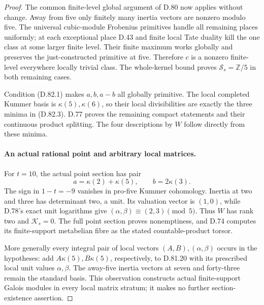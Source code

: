 \begin{proof}
The common finite-level global argument of D.80 now
applies without change. Away from five only finitely
many inertia vectors are nonzero modulo five.
The universal cubic-module Frobenius primitives handle
all remaining places uniformly; at each exceptional
place D.43 and finite local Tate duality kill the one
class at some larger finite level. Their finite maximum
works globally and preserves the just-constructed
primitive at five. Therefore \(c\) is a nonzero
finite-level everywhere locally trivial class. The
whole-kernel bound proves
\(\mathcal S_s=\mathbb Z/5\) in both remaining cases.

Condition (D.82.1) makes \(a,b,a-b\) all globally
primitive. The local completed Kummer basis is
\(\kappa(5),\kappa(6)\), so their local divisibilities
are exactly the three minima in (D.82.3).
D.77 proves the remaining compact statements and their
continuous product splitting. The four descriptions
by \(W\) follow directly from these minima.

\paragraph{An actual rational point and arbitrary local matrices.}
For \(t=10\), the actual point section has pair
\[
        a=\kappa(2)+\kappa(5),\qquad b=2\kappa(3).
                                                               \tag{D.82.20}
\]
The sign in \(1-t=-9\) vanishes in pro-five Kummer cohomology.
Inertia at two and three has determinant two, a unit.
Its valuation vector is \((1,0)\), while D.78's exact
unit logarithms give
\((\alpha,\beta)\equiv(2,3)\pmod5\).
Thus \(W\) has rank two and \(\mathcal K_s=0\).
The full point section proves nonemptiness, and D.74
computes its finite-support metabelian fibre as the
stated countable-product torsor.

More generally every integral pair of local vectors
\((A,B),(\alpha,\beta)\) occurs in the hypotheses:
add \(A\kappa(5),B\kappa(5)\), respectively, to
D.81.20 with its prescribed local unit values
\(\alpha,\beta\). The away-five inertia vectors at
seven and forty-three remain the standard basis.
This observation constructs actual finite-support
Galois modules in every local matrix stratum; it makes
no further section-existence assertion.
\end{proof}
